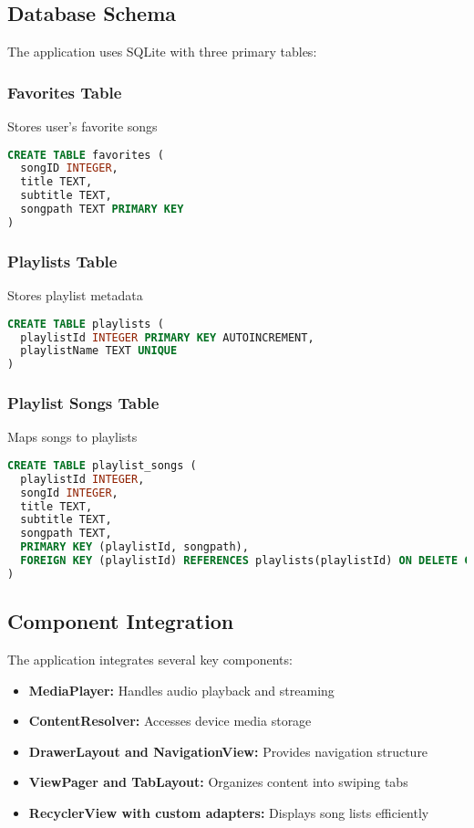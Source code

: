 \documentclass{article}
\begin{document}
\subsection{Database Schema}
The application uses SQLite with three primary tables:

\subsubsection{Favorites Table}
Stores user's favorite songs
\begin{lstlisting}[language=SQL]
CREATE TABLE favorites (
  songID INTEGER,
  title TEXT,
  subtitle TEXT,
  songpath TEXT PRIMARY KEY
)
\end{lstlisting}

\subsubsection{Playlists Table}
Stores playlist metadata
\begin{lstlisting}[language=SQL]
CREATE TABLE playlists (
  playlistId INTEGER PRIMARY KEY AUTOINCREMENT,
  playlistName TEXT UNIQUE
)
\end{lstlisting}

\subsubsection{Playlist Songs Table}
Maps songs to playlists
\begin{lstlisting}[language=SQL]
CREATE TABLE playlist_songs (
  playlistId INTEGER,
  songId INTEGER,
  title TEXT,
  subtitle TEXT,
  songpath TEXT,
  PRIMARY KEY (playlistId, songpath),
  FOREIGN KEY (playlistId) REFERENCES playlists(playlistId) ON DELETE CASCADE
)
\end{lstlisting}

\subsection{Component Integration}
The application integrates several key components:
\begin{itemize}
    \item \textbf{MediaPlayer:} Handles audio playback and streaming
    \item \textbf{ContentResolver:} Accesses device media storage
    \item \textbf{DrawerLayout and NavigationView:} Provides navigation structure
    \item \textbf{ViewPager and TabLayout:} Organizes content into swiping tabs
    \item \textbf{RecyclerView with custom adapters:} Displays song lists efficiently
\end{itemize}
\end{document}
